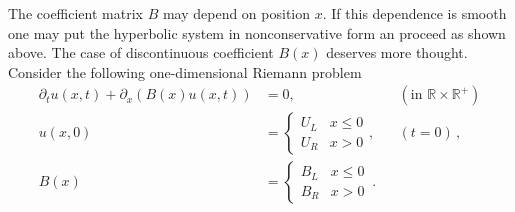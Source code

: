 \documentclass[a4paper,12pt]{article}
\theoremstyle{definition}
\theoremstyle{definition}
\begin{document}
The coefficient matrix $B$ may depend on position $x$. If this dependence is smooth
one may put the hyperbolic system in nonconservative form an proceed as shown
above. The case of discontinuous coefficient $B(x)$ deserves more thought.
Consider the following one-dimensional Riemann problem
\begin{subequations}
	\begin{align}\label{eq:DiscontinuousRiemann}
	\partial_t u(x,t) + \partial_x (B(x) u(x,t)) &= 0, &&(\text{in $\mathbb{R}\times\mathbb{R}^+$})\\
	u(x,0) &= \left\{\begin{array}{ll}
	U_L & x \leq 0\\ U_R & x > 0
	\end{array}\right ., &&(t=0)\,,\\
	B(x) &= \left\{\begin{array}{ll}
	B_L & x \leq 0\\ B_R & x > 0
	\end{array}\right. \,.
	\end{align}
\end{subequations}
\end{document}
